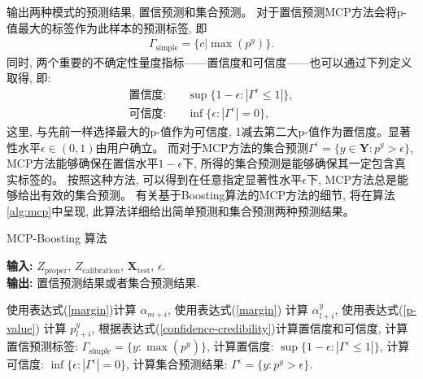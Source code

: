 输出两种模式的预测结果, 置信预测和集合预测。 对于置信预测MCP方法会将p-值最大的标签作为此样本的预测标签, 即
\begin{align}
\Gamma_{\text{simple}} = \{c | \max (p^{y})\}.
\end{align}
同时, 两个重要的不确定性量度指标——置信度和可信度——也可以通过下列定义取得\citep{2006Hedging}, 即:
\begin{align}
\label{confidence-credibility}
\textsf{置信度:} \quad &\sup\{1-\epsilon: |\Gamma^{\epsilon} \leq 1|\}, \\
\textsf{可信度:} \quad &\inf\{\epsilon: |\Gamma^{\epsilon}| = 0\},
\end{align}
这里, 与先前一样选择最大的p-值作为可信度, 1减去第二大p-值作为置信度。显著性水平$\epsilon \in (0,1)$由用户确立。 而对于MCP方法的集合预测$\Gamma^{\epsilon} = \{y \in \mathbf{Y}: p^{y} > \epsilon\}$, MCP方法能够确保在置信水平$1-\epsilon$下, 所得的集合预测是能够确保其一定包含真实标签的。 按照这种方法, 可以得到在任意指定显著性水平$\epsilon$下, MCP方法总是能够给出有效的集合预测。 有关基于Boosting算法的MCP方法的细节, 将在算法\ref{alg:mcp}中呈现, 此算法详细给出简单预测和集合预测两种预测结果。
\begin{algorithm}[]
    \small
    \caption{MCP-Boosting 算法}\label{alg:mcp}
    \hspace*{\algorithmicindent} \textbf{输入:} {$Z_{\text{proper}}$, $Z_{\text{calibration}}$, $\mathbf{X}_{\text{test}}$, $\epsilon$.}\\
    \hspace*{\algorithmicindent} \textbf{输出:} {置信预测结果或者集合预测结果.}
    \begin{algorithmic}[1]
        \State  使用表达式(\ref{margin})计算 $\alpha_{m+i}$,
        \EndFor
        \EndFor
        \State  使用表达式(\ref{margin}) 计算 $\alpha_{l+i}^{y}$,
        \State  使用表达式(\ref{p-value}) 计算 $p_{l+i}^{y}$,
        \State 根据表达式(\ref{confidence-credibility})计算置信度和可信度,
        \EndFor
        \EndFor
        \EndFor
        \State 计算置信预测标签: $\Gamma_{\text{simple}} = \{y: \max(p_{}^{y})\}$,
        \State 计算置信度: $\sup\{1-\epsilon: |\Gamma^{\epsilon} \leq 1|\}$,
        \State 计算可信度: $\inf\{\epsilon: |\Gamma^{\epsilon}| = 0\}$,
        \EndWhile
        \State 计算集合预测结果: $\Gamma_{}^{\epsilon} = \{y: p_{}^{y} > \epsilon\}$.
        \EndWhile
        \EndProcedure
    \end{algorithmic}
\end{algorithm}



